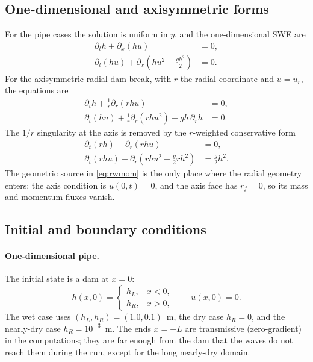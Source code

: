﻿\documentclass[11pt,a4paper]{article}
\begin{document}
\subsection{One-dimensional and axisymmetric forms}
For the pipe cases the solution is uniform in $y$, and the one-dimensional SWE
are
\begin{align}
  \partial_t h + \partial_x(hu) &= 0, \label{eq:1dmass}\\
  \partial_t(hu) + \partial_x\left(hu^2+\frac{g h^2}{2}\right) &= 0 .
  \label{eq:1dmom}
\end{align}
For the axisymmetric radial dam break, with $r$ the radial coordinate and
$u=u_r$, the equations are
\begin{align}
  \partial_t h + \frac{1}{r}\partial_r(r h u) &= 0, \label{eq:radmass}\\
  \partial_t(hu) + \frac{1}{r}\partial_r(r h u^2) + g h\,\partial_r h &= 0 .
  \label{eq:radmom}
\end{align}
The $1/r$ singularity at the axis is removed by the $r$-weighted conservative
form
\begin{align}
  \partial_t(r h) + \partial_r(r h u) &= 0, \label{eq:rwmass}\\
  \partial_t(r h u) + \partial_r\left(r h u^2+\frac{g}{2}r h^2\right)
  &= \frac{g}{2}h^2 . \label{eq:rwmom}
\end{align}
The geometric source in \eqref{eq:rwmom} is the only place where the radial
geometry enters; the axis condition is $u(0,t)=0$, and the axis face has
$r_f=0$, so its mass and momentum fluxes vanish.

\subsection{Initial and boundary conditions}
\paragraph{One-dimensional pipe.}
The initial state is a dam at $x=0$:
\begin{equation}
  h(x,0)=
  \begin{cases}
    h_L,& x<0,\\
    h_R,& x>0,
  \end{cases}
  \qquad u(x,0)=0 .
  \label{eq:ic1d}
\end{equation}
The wet case uses $(h_L,h_R)=(1.0,0.1)$~m, the dry case $h_R=0$, and the
nearly-dry case $h_R=10^{-3}$~m.  The ends $x=\pm L$ are transmissive
(zero-gradient) in the computations; they are far enough from the dam that the
waves do not reach them during the run, except for the long nearly-dry domain.
\end{document}
